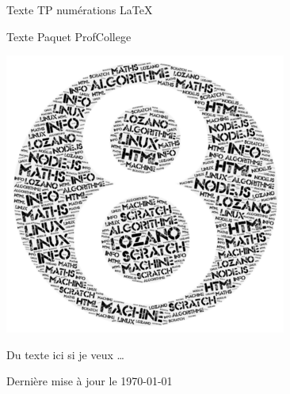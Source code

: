 \pagestyle{backCover}
\parindent=0pt
Texte  TP numérations \LaTeX 

Texte  Paquet ProfCollege
\begin{center}
    \includegraphics[scale=0.5]{images/8.png}%
\end{center}
\hrulefill

Du texte ici si je veux \ldots

\hrulefill
\vspace*{1cm}
\begin{center}\bfseries\Large
    \myAuthorName
\end{center}
\begin{center}\bfseries
    \myAuthorSchoolName

    \currentSchoolYear
\end{center}    
    
\begin{flushright}
       Dernière mise à jour le \today 
\end{flushright}   
